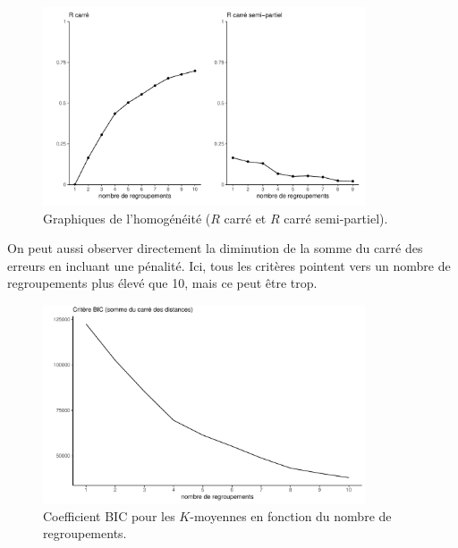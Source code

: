 \documentclass[
  11pt,
  letterpaper,
]{scrbook}
\theoremstyle{definition}
\theoremstyle{remark}
\begin{document}
\begin{figure}[ht!]

{\centering \includegraphics[width=0.85\textwidth,height=\textheight]{regroupements_files/figure-pdf/fig-homogeneite-1.pdf}

}

\caption{\label{fig-homogeneite}Graphiques de l'homogénéité (\(R\) carré
et \(R\) carré semi-partiel).}

\end{figure}

On peut aussi observer directement la diminution de la somme du carré
des erreurs en incluant une pénalité. Ici, tous les critères pointent
vers un nombre de regroupements plus élevé que 10, mais ce peut être
trop.

\begin{figure}[ht!]

{\centering \includegraphics[width=0.85\textwidth,height=\textheight]{regroupements_files/figure-pdf/fig-bickmoy-1.pdf}

}

\caption{\label{fig-bickmoy}Coefficient BIC pour les \(K\)-moyennes en
fonction du nombre de regroupements.}

\end{figure}
\end{document}

